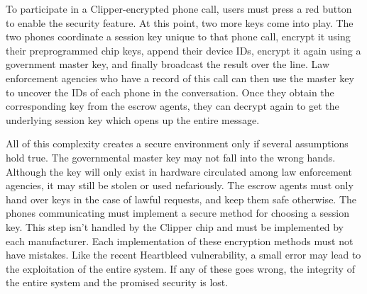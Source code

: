 \documentclass[12pt]{turabian-researchpaper}
\begin{document}
To participate in a Clipper-encrypted phone call, users must press a red button to enable the security feature. At this point, two more keys come into play.
The two phones coordinate a session key unique to that phone call, encrypt it using their preprogrammed chip keys, append their device IDs, encrypt it again using a government master key, and finally broadcast the result over the line.
Law enforcement agencies who have a record of this call can then use the master key to uncover the IDs of each phone in the conversation.
Once they obtain the corresponding key from the escrow agents, they can decrypt again to get the underlying session key which opens up the entire message.

All of this complexity creates a secure environment only if several assumptions hold true.
The governmental master key may not fall into the wrong hands. Although the key will only exist in hardware circulated among law enforcement agencies, it may still be stolen or used nefariously.
The escrow agents must only hand over keys in the case of lawful requests, and keep them safe otherwise.
The phones communicating must implement a secure method for choosing a session key. This step isn't handled by the Clipper chip and must be implemented by each manufacturer.
Each implementation of these encryption methods must not have mistakes. Like the recent Heartbleed vulnerability, a small error may lead to the exploitation of the entire system.
If any of these goes wrong, the integrity of the entire system and the promised security is lost.





\pagebreak

\theendnotes

\printbibliography
\end{document}
